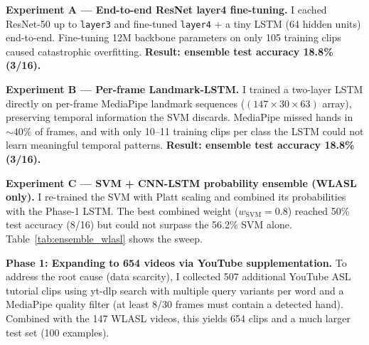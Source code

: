 \documentclass[final]{article}
\begin{document}
\textbf{Experiment A --- End-to-end ResNet layer4 fine-tuning.}
I cached ResNet-50 up to \texttt{layer3} and fine-tuned \texttt{layer4} +
a tiny LSTM (64 hidden units) end-to-end. Fine-tuning 12M backbone parameters
on only 105 training clips caused catastrophic overfitting.
\textbf{Result: ensemble test accuracy 18.8\% (3/16).}

\textbf{Experiment B --- Per-frame Landmark-LSTM.}
I trained a two-layer LSTM directly on per-frame MediaPipe landmark sequences
($(147\times30\times63)$ array), preserving temporal information the SVM
discards. MediaPipe missed hands in ${\sim}40\%$ of frames, and with only
10--11 training clips per class the LSTM could not learn meaningful temporal
patterns. \textbf{Result: ensemble test accuracy 18.8\% (3/16).}

\textbf{Experiment C --- SVM + CNN-LSTM probability ensemble (WLASL only).}
I re-trained the SVM with Platt scaling and combined its probabilities with
the Phase-1 LSTM. The best combined weight ($w_\text{SVM}{=}0.8$) reached
50\% test accuracy (8/16) but could not surpass the 56.2\% SVM alone.
Table~\ref{tab:ensemble_wlasl} shows the sweep.

\begin{table}[h]
  \centering
  \caption{SVM + CNN-LSTM ensemble sweep on WLASL-only data (16-example test).
           CNN-LSTM adds noise rather than signal in the small-data regime.}
  \label{tab:ensemble_wlasl}
\end{table}

\textbf{Phase 1: Expanding to 654 videos via YouTube supplementation.}
To address the root cause (data scarcity), I collected 507 additional YouTube
ASL tutorial clips using yt-dlp search with multiple query variants per word
and a MediaPipe quality filter (at least 8/30 frames must contain a detected
hand). Combined with the 147 WLASL videos, this yields 654 clips and a much
larger test set (100 examples).
\end{document}
